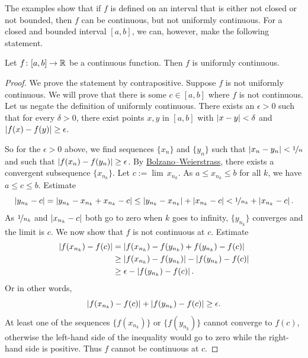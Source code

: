The examples show that if $f$ is defined on an interval that is either not closed
or not bounded, then $f$ can be continuous, but not uniformly continuous.
For a closed and bounded interval $[a,b]$, we can, however,
make the following statement.

\begin{thm} \label{unifcont:thm}
Let $f \colon [a,b] \to {\mathbb{R}}$ be a continuous function.  Then $f$
is uniformly continuous.
\end{thm}

\begin{proof}
We prove the statement by contrapositive.
Suppose $f$ is not uniformly continuous.  We will prove
that there is some
$c \in [a,b]$ where $f$ is not continuous.  Let us negate
the definition of uniformly continuous.
There exists an $\epsilon > 0$
such that for every $\delta > 0$, there exist points $x, y$ in $[a,b]$ with
$\left\lvert {x-y} \right\rvert < \delta$ and $\left\lvert {f(x)-f(y)} \right\rvert \geq \epsilon$.

So for the $\epsilon > 0$ above,
we find sequences $\{ x_n \}$ and $\{ y_n \}$ such that
$\left\lvert {x_n-y_n} \right\rvert < \nicefrac{1}{n}$ and such that $\left\lvert {f(x_n)-f(y_n)} \right\rvert \geq
\epsilon$.  By
\hyperref[thm:bwseq]{Bolzano--Weierstrass},
there exists a convergent subsequence
$\{ x_{n_k} \}$.  Let $c := \lim\, x_{n_k}$.
As $a \leq x_{n_k} \leq b$ for all $k$, we have $a \leq c \leq b$.  Estimate
\begin{equation*}
\left\lvert {y_{n_k} - c} \right\rvert =
\left\lvert {y_{n_k} - x_{n_k} + x_{n_k} - c} \right\rvert \leq
\left\lvert {y_{n_k} - x_{n_k}} \right\rvert
+
\left\lvert {x_{n_k}-c} \right\rvert
<
\nicefrac{1}{n_k} 
+
\left\lvert {x_{n_k}-c} \right\rvert .
\end{equation*}
As $\nicefrac{1}{n_k}$ and $\left\lvert {x_{n_k}-c} \right\rvert$ both go to zero when
$k$ goes to infinity, $\{ y_{n_k} \}$ converges and the limit
is $c$.  We now show that $f$ is not continuous at $c$.
Estimate
\begin{equation*}
\begin{split}
\left\lvert {f(x_{n_k}) - f(c)} \right\rvert & =
\left\lvert {f(x_{n_k}) - f(y_{n_k}) + f(y_{n_k}) - f(c)} \right\rvert \\
& \geq
\left\lvert {f(x_{n_k}) - f(y_{n_k})} \right\rvert - \left\lvert {f(y_{n_k}) - f(c)} \right\rvert \\
& \geq
\epsilon - \left\lvert {f(y_{n_k})-f(c)} \right\rvert .
\end{split}
\end{equation*}
Or in other words,
\begin{equation*}
\left\lvert {f(x_{n_k})-f(c)} \right\rvert 
+
\left\lvert {f(y_{n_k})-f(c)} \right\rvert  \geq
\epsilon .
\end{equation*}
At least one of the sequences $\{ f(x_{n_k}) \}$  or
$\{ f(y_{n_k}) \}$ cannot converge to $f(c)$, otherwise the
left-hand side of the inequality would go to zero while the right-hand side is positive.
Thus $f$ cannot be continuous at $c$.
\end{proof}

